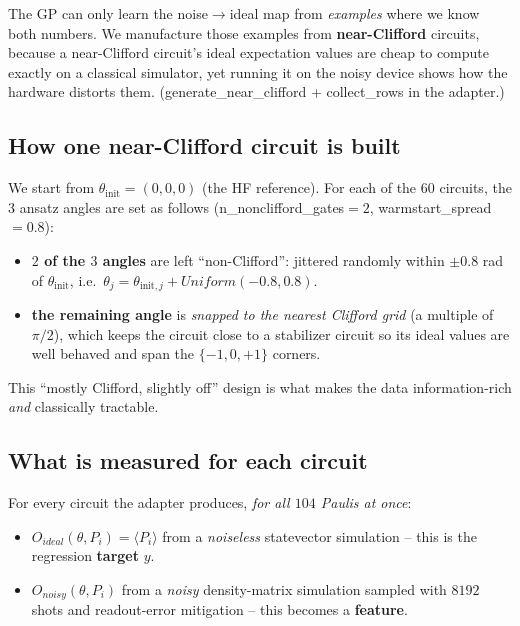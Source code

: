 \documentclass[11pt]{article}
\def\bm#1{#1}%
\def\texttt#1{#1}%
\def\mathrm#1{#1}%
\begin{document}
The GP can only learn the noise$\to$ideal map from \emph{examples} where we know
both numbers. We manufacture those examples from \textbf{near-Clifford} circuits,
because a near-Clifford circuit's ideal expectation values are cheap to compute
exactly on a classical simulator, yet running it on the noisy device shows how the
hardware distorts them. (\texttt{generate\_near\_clifford} +
\texttt{collect\_rows} in the adapter.)

\subsection{How one near-Clifford circuit is built}
We start from $\bm\theta_{\text{init}}=(0,0,0)$ (the HF reference). For each of the
$60$ circuits, the $3$ ansatz angles are set as follows
(\texttt{n\_nonclifford\_gates}$=2$, \texttt{warmstart\_spread}$=0.8$):
\begin{itemize}
  \item \textbf{$2$ of the $3$ angles} are left ``non-Clifford'': jittered
        randomly within $\pm0.8$ rad of $\bm\theta_{\text{init}}$, i.e.\
        $\theta_j=\theta_{\text{init},j}+\mathrm{Uniform}(-0.8,0.8)$.
  \item \textbf{the remaining angle} is \emph{snapped to the nearest Clifford
        grid} (a multiple of $\pi/2$), which keeps the circuit close to a
        stabilizer circuit so its ideal values are well behaved and span the
        $\{-1,0,+1\}$ corners.
\end{itemize}
This ``mostly Clifford, slightly off'' design is what makes the data
information-rich \emph{and} classically tractable.

\subsection{What is measured for each circuit}
For every circuit the adapter produces, \emph{for all $104$ Paulis at once}:
\begin{itemize}
  \item $O_{\mathrm{ideal}}(\bm\theta,P_i)=\langle P_i\rangle$ from a
        \emph{noiseless} statevector simulation -- this is the regression
        \textbf{target} $y$.
  \item $O_{\mathrm{noisy}}(\bm\theta,P_i)$ from a \emph{noisy} density-matrix
        simulation sampled with $8192$ shots and readout-error mitigation -- this
        becomes a \textbf{feature}.
\end{itemize}
\end{document}
